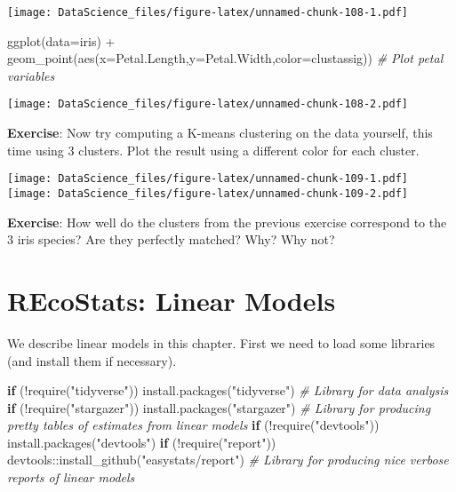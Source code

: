 \documentclass[
]{book}
\newenvironment{Shaded}{\begin{snugshade}}{\end{snugshade}}
\newcommand{\AttributeTok}[1]{\textcolor[rgb]{0.77,0.63,0.00}{#1}}
\newcommand{\CommentTok}[1]{\textcolor[rgb]{0.56,0.35,0.01}{\textit{#1}}}
\newcommand{\ControlFlowTok}[1]{\textcolor[rgb]{0.13,0.29,0.53}{\textbf{#1}}}
\newcommand{\FunctionTok}[1]{\textcolor[rgb]{0.00,0.00,0.00}{#1}}
\newcommand{\NormalTok}[1]{#1}
\newcommand{\SpecialCharTok}[1]{\textcolor[rgb]{0.00,0.00,0.00}{#1}}
\newcommand{\StringTok}[1]{\textcolor[rgb]{0.31,0.60,0.02}{#1}}
\begin{document}
\texttt{[image: DataScience\_files/figure-latex/unnamed-chunk-108-1.pdf]}

\begin{Shaded}
\begin{Highlighting}[]
\FunctionTok{ggplot}\NormalTok{(}\AttributeTok{data=}\NormalTok{iris) }\SpecialCharTok{+} \FunctionTok{geom\_point}\NormalTok{(}\FunctionTok{aes}\NormalTok{(}\AttributeTok{x=}\NormalTok{Petal.Length,}\AttributeTok{y=}\NormalTok{Petal.Width,}\AttributeTok{color=}\NormalTok{clustassig)) }\CommentTok{\# Plot petal variables}
\end{Highlighting}
\end{Shaded}

\texttt{[image: DataScience\_files/figure-latex/unnamed-chunk-108-2.pdf]}

\textbf{Exercise}: Now try computing a K-means clustering on the data yourself, this time using 3 clusters. Plot the result using a different color for each cluster.

\texttt{[image: DataScience\_files/figure-latex/unnamed-chunk-109-1.pdf]} \texttt{[image: DataScience\_files/figure-latex/unnamed-chunk-109-2.pdf]}

\textbf{Exercise}: How well do the clusters from the previous exercise correspond to the 3 iris species? Are they perfectly matched? Why? Why not?

\hypertarget{recostats-linear-models}{%
\chapter{REcoStats: Linear Models}\label{recostats-linear-models}}

We describe linear models in this chapter. First we need to load some libraries (and install them if necessary).

\begin{Shaded}
\begin{Highlighting}[]
\ControlFlowTok{if}\NormalTok{ (}\SpecialCharTok{!}\FunctionTok{require}\NormalTok{(}\StringTok{"tidyverse"}\NormalTok{)) }\FunctionTok{install.packages}\NormalTok{(}\StringTok{"tidyverse"}\NormalTok{) }\CommentTok{\# Library for data analysis}
\ControlFlowTok{if}\NormalTok{ (}\SpecialCharTok{!}\FunctionTok{require}\NormalTok{(}\StringTok{"stargazer"}\NormalTok{)) }\FunctionTok{install.packages}\NormalTok{(}\StringTok{"stargazer"}\NormalTok{) }\CommentTok{\# Library for producing pretty tables of estimates from linear models}
\ControlFlowTok{if}\NormalTok{ (}\SpecialCharTok{!}\FunctionTok{require}\NormalTok{(}\StringTok{"devtools"}\NormalTok{)) }\FunctionTok{install.packages}\NormalTok{(}\StringTok{"devtools"}\NormalTok{)}
\ControlFlowTok{if}\NormalTok{ (}\SpecialCharTok{!}\FunctionTok{require}\NormalTok{(}\StringTok{"report"}\NormalTok{)) devtools}\SpecialCharTok{::}\FunctionTok{install\_github}\NormalTok{(}\StringTok{"easystats/report"}\NormalTok{) }\CommentTok{\# Library for producing nice verbose reports of linear models}
\end{Highlighting}
\end{Shaded}
\end{document}

